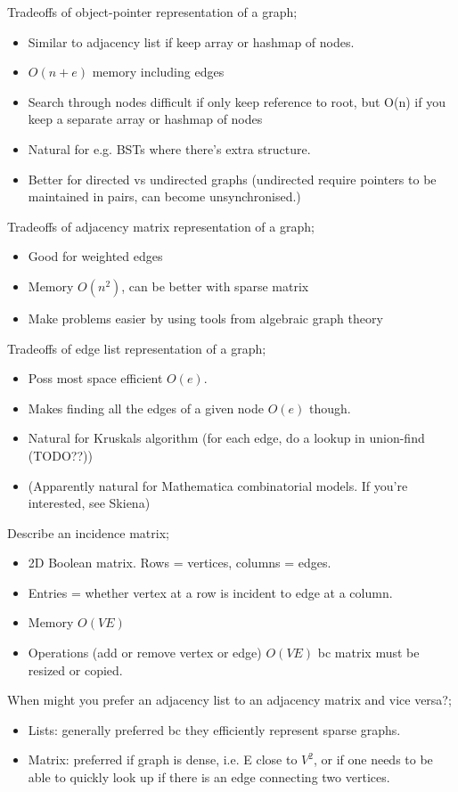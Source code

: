 \documentclass{article}
\begin{document}
Tradeoffs of object-pointer representation of a graph; \begin{itemize} \item Similar to adjacency list if keep array or hashmap of nodes.  \item $O(n+e)$ memory including edges \item Search through nodes difficult if only keep reference to root, but O(n) if you keep a separate array or hashmap of nodes \item Natural for e.g. BSTs where there's extra structure.  \item Better for directed vs undirected graphs (undirected require pointers to be maintained in pairs, can become unsynchronised.) \end{itemize}

Tradeoffs of adjacency matrix representation of a graph; \begin{itemize} \item Good for weighted edges \item Memory $O(n^2)$, can be better with sparse matrix \item Make problems easier by using tools from algebraic graph theory \end{itemize}

Tradeoffs of edge list representation of a graph; \begin{itemize} \item Poss most space efficient $O(e)$.  \item Makes finding all the edges of a given node $O(e)$ though.  \item Natural for Kruskals algorithm (for each edge, do a lookup in union-find (TODO??)) \item (Apparently natural for Mathematica combinatorial models. If you're interested, see Skiena) \end{itemize} 

Describe an incidence matrix; \begin{itemize} \item 2D Boolean matrix. Rows = vertices, columns = edges.  \item Entries = whether vertex at a row is incident to edge at a column.  \item Memory $O(VE)$ \item Operations (add or remove vertex or edge) $O(VE)$ bc matrix must be resized or copied.  \end{itemize} 

When might you prefer an adjacency list to an adjacency matrix and vice versa?; \begin{itemize} \item Lists: generally preferred bc they efficiently represent sparse graphs.  \item Matrix: preferred if graph is dense, i.e. E close to $V^2$, or if one needs to be able to quickly look up if there is an edge connecting two vertices.  \end{itemize} 
            
\end{document}

